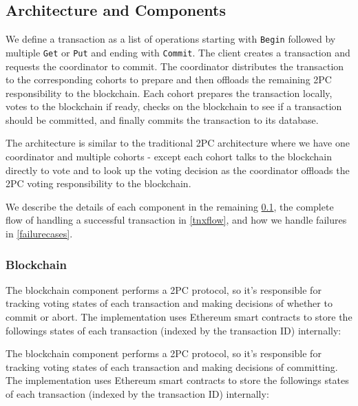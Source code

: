\documentclass[11pt,conference]{IEEEtran}
\begin{document}
\subsection{Architecture and Components} \label{components}

We define a transaction as a list of operations starting with \texttt{Begin} followed by multiple \texttt{Get} or \texttt{Put} and ending with \texttt{Commit}. The client creates a transaction and requests the coordinator to commit. The coordinator distributes the transaction to the corresponding cohorts to prepare and then offloads the remaining 2PC responsibility to the blockchain. Each cohort prepares the transaction locally, votes to the blockchain if ready, checks on the blockchain to see if a transaction should be committed, and finally commits the transaction to its database.

The architecture is similar to the traditional 2PC architecture where we have one coordinator and multiple cohorts - except each cohort talks to the blockchain directly to vote and to look up the voting decision as the coordinator offloads the 2PC voting responsibility to the blockchain.

We describe the details of each component in the remaining \ref{components}, the complete flow of handling a successful transaction in \ref{tnxflow}, and how we handle failures in \ref{failurecases}.


\subsubsection{Blockchain} \label{blockchain}

The blockchain component performs a 2PC protocol, so it’s responsible for tracking voting states of each transaction and making decisions of whether to commit or abort. The implementation uses Ethereum smart contracts to store the followings states of each transaction (indexed by the transaction ID) internally:

The blockchain component performs a 2PC protocol, so it’s responsible for tracking voting states of each transaction and making decisions of committing. The implementation uses Ethereum smart contracts to store the followings states of each transaction (indexed by the transaction ID) internally:
\end{document}
